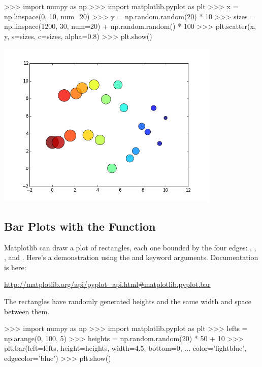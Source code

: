 \documentclass[11pt]{cselabheader}
\begin{document}
\begin{pyconcode}
>>> import numpy as np
>>> import matplotlib.pyplot as plt
>>> x = np.linspace(0, 10, num=20)
>>> y = np.random.random(20) * 10
>>> sizes = np.linspace(1200, 30, num=20) + np.random.random() * 100
>>> plt.scatter(x, y, s=sizes, c=sizes, alpha=0.8)
>>> plt.show()
\end{pyconcode}

\begin{center}
\includegraphics[width=0.8\textwidth]{img/matplotlib_scatter.png}
\end{center}

\subsection{Bar Plots with the  Function}

Matplotlib can draw a plot of rectangles, each one bounded by the four edges:
, , , and
. Here's a demonstration using the
 and  keyword arguments.
Documentation is here:

\begin{center}
\url{http://matplotlib.org/api/pyplot_api.html#matplotlib.pyplot.bar}
\end{center}


The rectangles have randomly generated heights and the same width and space
between them.

\begin{pyconcode}
>>> import numpy as np
>>> import matplotlib.pyplot as plt
>>> lefts = np.arange(0, 100, 5)
>>> heights = np.random.random(20) * 50 + 10
>>> plt.bar(left=lefts, height=heights, width=4.5, bottom=0,
...         color='lightblue', edgecolor='blue')
>>> plt.show()
\end{pyconcode}
\end{document}
